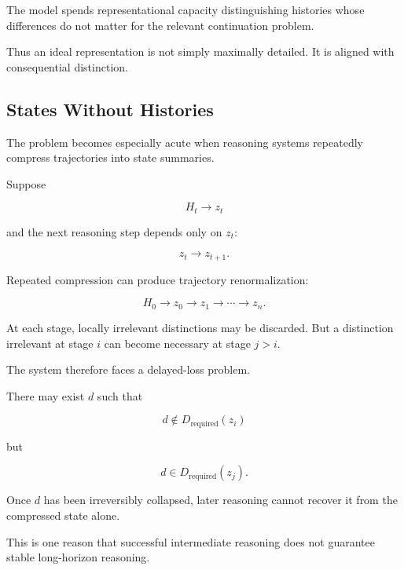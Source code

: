 \documentclass[11pt]{article}
\theoremstyle{remark}
\begin{document}
The model spends representational capacity distinguishing histories whose differences do not matter for the relevant continuation problem.

Thus an ideal representation is not simply maximally detailed. It is aligned with consequential distinction.

\subsection{States Without Histories}

The problem becomes especially acute when reasoning systems repeatedly compress trajectories into state summaries.

Suppose

\begin{equation}
H_t
\longrightarrow
z_t
\end{equation}

and the next reasoning step depends only on $z_t$:

\begin{equation}
z_t
\longrightarrow
z_{t+1}.
\end{equation}

Repeated compression can produce trajectory renormalization:

\begin{equation}
H_0
\rightarrow
z_0
\rightarrow
z_1
\rightarrow
\cdots
\rightarrow
z_n.
\end{equation}

At each stage, locally irrelevant distinctions may be discarded. But a distinction irrelevant at stage $i$ can become necessary at stage $j>i$.

The system therefore faces a delayed-loss problem.

There may exist $d$ such that

\begin{equation}
d\notin
D_{\mathrm{required}}(z_i)
\end{equation}

but

\begin{equation}
d\in
D_{\mathrm{required}}(z_j).
\end{equation}

Once $d$ has been irreversibly collapsed, later reasoning cannot recover it from the compressed state alone.

This is one reason that successful intermediate reasoning does not guarantee stable long-horizon reasoning.
\end{document}
